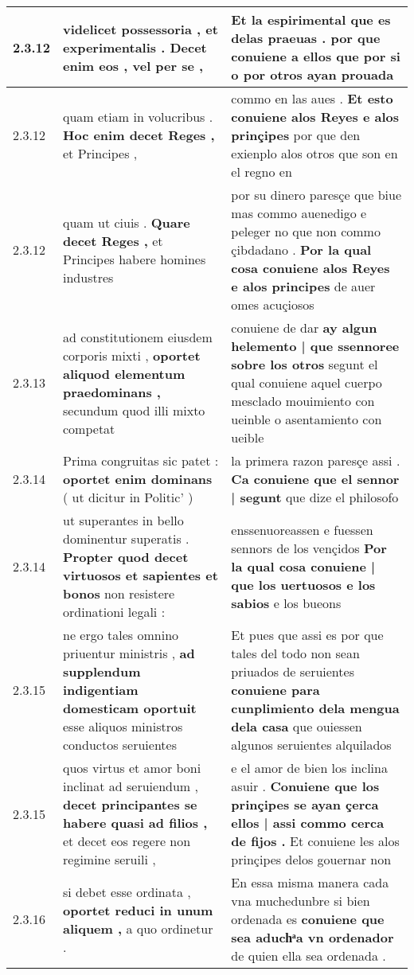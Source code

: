 \begin{tabular}{|p{1cm}|p{6.5cm}|p{6.5cm}|}
2.3.12 & videlicet possessoria , et experimentalis . \textbf{ Decet enim eos , } vel per se , & Et la espirimental que es delas praeuas . \textbf{ por que conuiene a ellos } que por si o por otros ayan prouada \\\hline
2.3.12 & quam etiam in volucribus . \textbf{ Hoc enim decet Reges , } et Principes , & commo en las aues . \textbf{ Et esto conuiene alos Reyes e alos prinçipes } por que den exienplo alos otros que son en el regno en \\\hline
2.3.12 & quam ut ciuis . \textbf{ Quare decet Reges , } et Principes habere homines industres & por su dinero paresçe que biue mas commo auenedigo e peleger no que non commo çibdadano . \textbf{ Por la qual cosa conuiene alos Reyes e alos principes } de auer omes acuçiosos \\\hline
2.3.13 & ad constitutionem eiusdem corporis mixti , \textbf{ oportet aliquod elementum praedominans , } secundum quod illi mixto competat & conuiene de dar \textbf{ ay algun helemento | que ssennoree sobre los otros } segunt el qual conuiene aquel cuerpo mesclado mouimiento con ueinble o asentamiento con ueible \\\hline
2.3.14 & Prima congruitas sic patet : \textbf{ oportet enim dominans } ( ut dicitur in Politic’ ) & la primera razon paresçe assi . \textbf{ Ca conuiene que el sennor | segunt } que dize el philosofo \\\hline
2.3.14 & ut superantes in bello dominentur superatis . \textbf{ Propter quod decet virtuosos et sapientes et bonos } non resistere ordinationi legali : & enssenuoreassen e fuessen sennors de los vençidos \textbf{ Por la qual cosa conuiene | que los uertuosos e los sabios } e los bueons \\\hline
2.3.15 & ne ergo tales omnino priuentur ministris , \textbf{ ad supplendum indigentiam domesticam oportuit } esse aliquos ministros conductos seruientes & Et pues que assi es por que tales del todo non sean priuados de seruientes \textbf{ conuiene para cunplimiento dela mengua dela casa } que ouiessen algunos seruientes alquilados \\\hline
2.3.15 & quos virtus et amor boni inclinat ad seruiendum , \textbf{ decet principantes se habere quasi ad filios , } et decet eos regere non regimine seruili , & e el amor de bien los inclina asuir . \textbf{ Conuiene que los prinçipes se ayan çerca ellos | assi commo cerca de fijos . } Et conuiene les alos prinçipes delos gouernar non \\\hline
2.3.16 & si debet esse ordinata , \textbf{ oportet reduci in unum aliquem , } a quo ordinetur . & En essa misma manera cada vna muchedunbre si bien ordenada es \textbf{ conuiene que sea aduchͣa vn ordenador } de quien ella sea ordenada . \\\hline

\end{tabular}
